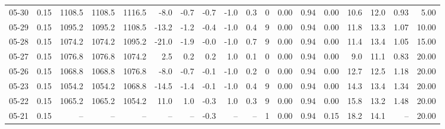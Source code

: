 \begin{threeparttable}
{\begin{tabular}{lrrrrrrrrrrrrrrrrr}
  05-30 &     0.15 & 1108.5 & 1108.5 & 1116.5 &       -8.0 &           -0.7 &                      -0.7 &                     -1.0 &                 0.3 &              0 &       0.00 &      0.94 &           0.00 &             10.6 &                12.0 &            0.93 &                   5.00 \\
  05-29 &     0.15 & 1095.2 & 1095.2 & 1108.5 &      -13.2 &           -1.2 &                      -0.4 &                     -1.0 &                 0.4 &              9 &       0.00 &      0.94 &           0.00 &             11.8 &                13.3 &            1.07 &                  10.00 \\
  05-28 &     0.15 & 1074.2 & 1074.2 & 1095.2 &      -21.0 &           -1.9 &                      -0.0 &                     -1.0 &                 0.7 &              9 &       0.00 &      0.94 &           0.00 &             11.4 &                13.4 &            1.05 &                  15.00 \\
  05-27 &     0.15 & 1076.8 & 1076.8 & 1074.2 &        2.5 &            0.2 &                       0.2 &                      1.0 &                 0.1 &              0 &       0.00 &      0.94 &           0.00 &              9.0 &                11.1 &            0.83 &                  20.00 \\
  05-26 &     0.15 & 1068.8 & 1068.8 & 1076.8 &       -8.0 &           -0.7 &                      -0.1 &                     -1.0 &                 0.2 &              0 &       0.00 &      0.94 &           0.00 &             12.7 &                12.5 &            1.18 &                  20.00 \\
  05-23 &     0.15 & 1054.2 & 1054.2 & 1068.8 &      -14.5 &           -1.4 &                      -0.1 &                     -1.0 &                 0.4 &              9 &       0.00 &      0.94 &           0.00 &             14.3 &                13.4 &            1.34 &                  20.00 \\
  05-22 &     0.15 & 1065.2 & 1065.2 & 1054.2 &       11.0 &            1.0 &                      -0.3 &                      1.0 &                 0.3 &              9 &       0.00 &      0.94 &           0.00 &             15.8 &                13.2 &            1.48 &                  20.00 \\
  05-21 &     0.15 &     -- &     -- &     -- &         -- &             -- &                      -0.3 &                       -- &                  -- &              1 &       0.00 &      0.94 &           0.15 &             18.2 &                14.1 &              -- &                  20.00 \\

\end{tabular}}
\end{threeparttable}
